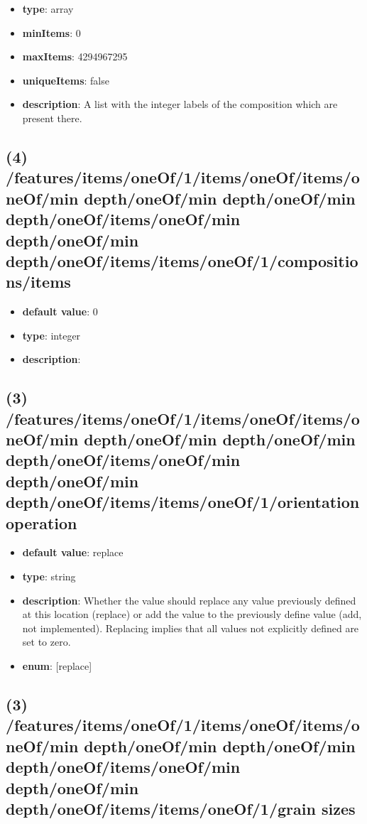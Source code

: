 \begin{itemize}[leftmargin=3em]\item {\bf type}: array
\item {\bf minItems}: 0
\item {\bf maxItems}: 4294967295
\item {\bf uniqueItems}: false
\item {\bf description}: A list with the integer labels of the composition which are present there.
\end{itemize}\subsection{(4) /features/items/oneOf/1/items/oneOf/items/oneOf/min depth/oneOf/min depth/oneOf/min depth/oneOf/items/oneOf/min depth/oneOf/min depth/oneOf/items/items/oneOf/1/compositions/items}
\begin{itemize}[leftmargin=4em]\item {\bf default value}: 0
\item {\bf type}: integer
\item {\bf description}: 
\end{itemize}\subsection{(3) /features/items/oneOf/1/items/oneOf/items/oneOf/min depth/oneOf/min depth/oneOf/min depth/oneOf/items/oneOf/min depth/oneOf/min depth/oneOf/items/items/oneOf/1/orientation operation}
\begin{itemize}[leftmargin=3em]\item {\bf default value}: replace
\item {\bf type}: string
\item {\bf description}: Whether the value should replace any value previously defined at this location (replace) or add the value to the previously define value (add, not implemented). Replacing implies that all values not explicitly defined are set to zero.
\item {\bf enum}: [replace]\end{itemize}\subsection{(3) /features/items/oneOf/1/items/oneOf/items/oneOf/min depth/oneOf/min depth/oneOf/min depth/oneOf/items/oneOf/min depth/oneOf/min depth/oneOf/items/items/oneOf/1/grain sizes}
